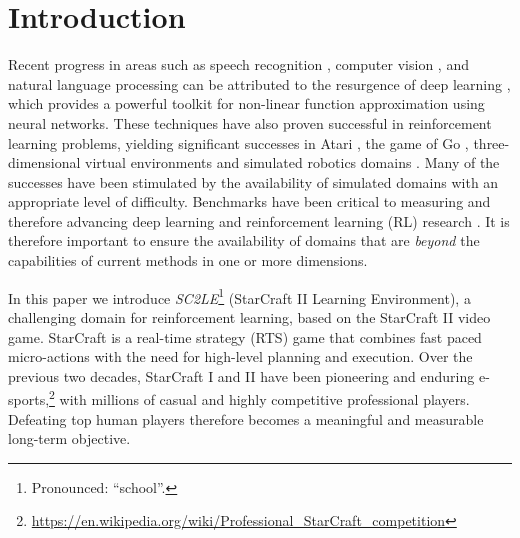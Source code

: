 \documentclass{article}
\newcommand{\footref}[2]{\href{#1}{#2}\footnote{\url{#1}}}
\begin{document}
\section{Introduction}

Recent progress in areas such as speech recognition \cite{Dahl:2012}, computer vision \cite{Krizhevsky:2012}, and natural language processing \cite{Wu:2016google} can be attributed to the resurgence of deep learning \cite{Lecun:2015deep}, which provides a powerful toolkit for non-linear function approximation using neural networks. These techniques have also proven successful in reinforcement learning problems, yielding significant successes in Atari \cite{mnih2015human}, the game of Go \cite{silver2016mastering}, three-dimensional virtual environments \cite{Beattie:2016} and simulated robotics domains \cite{Levine:2016,Rusu:2016}. Many of the successes have been stimulated by the availability of simulated domains with an appropriate level of difficulty. Benchmarks have been critical to measuring and therefore advancing deep learning and reinforcement learning (RL) research \cite{bellemare2013arcade,mnih2015human,DBLP:journals/ijcv/RussakovskyDSKS15,Duan:2016}. It is therefore important to ensure the availability of domains that are \emph{beyond} the capabilities of current methods in one or more dimensions.

In this paper we introduce \emph{SC2LE}\footnote{Pronounced: ``school''.} (StarCraft II Learning Environment), a challenging domain for reinforcement learning, based on the StarCraft II video game. StarCraft is a real-time strategy (RTS) game that combines fast paced micro-actions with the need for high-level planning and execution. Over the previous two decades, StarCraft I and II have been pioneering and enduring e-sports\footref{https://en.wikipedia.org/wiki/Professional_StarCraft_competition}, with millions of casual and highly competitive professional players. Defeating top human players therefore becomes a meaningful and measurable long-term objective. 
\end{document}

